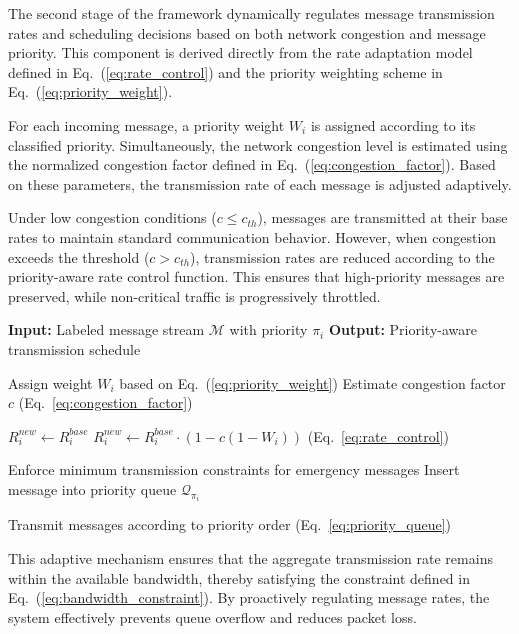 \documentclass[pdflatex,sn-mathphys-num]{sn-jnl}%
\theoremstyle{thmstyleone}%
\theoremstyle{thmstyletwo}%
\theoremstyle{thmstylethree}%
\begin{document}
The second stage of the framework dynamically regulates message transmission rates and scheduling decisions based on both network congestion and message priority. This component is derived directly from the rate adaptation model defined in Eq.~(\ref{eq:rate_control}) and the priority weighting scheme in Eq.~(\ref{eq:priority_weight}).

For each incoming message, a priority weight $W_i$ is assigned according to its classified priority. Simultaneously, the network congestion level is estimated using the normalized congestion factor defined in Eq.~(\ref{eq:congestion_factor}). Based on these parameters, the transmission rate of each message is adjusted adaptively.

Under low congestion conditions ($c \leq c_{th}$), messages are transmitted at their base rates to maintain standard communication behavior. However, when congestion exceeds the threshold ($c > c_{th}$), transmission rates are reduced according to the priority-aware rate control function. This ensures that high-priority messages are preserved, while non-critical traffic is progressively throttled.

\begin{algorithm}[H]
\caption{Priority-Aware Congestion Control and Scheduling}
\begin{algorithmic}[1]
\State \textbf{Input:} Labeled message stream $\mathcal{M}$ with priority $\pi_i$
\State \textbf{Output:} Priority-aware transmission schedule

    \State Assign weight $W_i$ based on Eq.~(\ref{eq:priority_weight})
    \State Estimate congestion factor $c$ (Eq.~\ref{eq:congestion_factor})
    
        \State $R_i^{new} \leftarrow R_i^{base}$
    \Else
        \State $R_i^{new} \leftarrow R_i^{base} \cdot (1 - c(1 - W_i))$ (Eq.~\ref{eq:rate_control})
    \EndIf
    
    \State Enforce minimum transmission constraints for emergency messages
    \State Insert message into priority queue $\mathcal{Q}_{\pi_i}$
\EndFor

    \State Transmit messages according to priority order (Eq.~\ref{eq:priority_queue})
\EndWhile

\end{algorithmic}
\end{algorithm}

This adaptive mechanism ensures that the aggregate transmission rate remains within the available bandwidth, thereby satisfying the constraint defined in Eq.~(\ref{eq:bandwidth_constraint}). By proactively regulating message rates, the system effectively prevents queue overflow and reduces packet loss.
\end{document}
